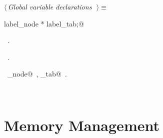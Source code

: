 \documentclass{report}
\begin{document}
\begin{flushleft} \small
\begin{minipage}{\linewidth} \label{scrap254}
$\langle\,${\it Global variable declarations}\nobreak\ {\footnotesize {}}$\,\rangle\equiv$
\vspace{-1ex}
\begin{list}{}{} \item
\mbox{}\verb@extern label_node * label_tab;@\\
\mbox{}\verb@@{\NWsep}
\end{list}
\vspace{-1ex}
\footnotesize\addtolength{\baselineskip}{-1ex}
\begin{list}{}{\setlength{\itemsep}{-\parsep}\setlength{\itemindent}{-\leftmargin}}
\item \NWtxtMacroDefBy\ .
\item \NWtxtMacroRefIn\ .
\end{list}
\vspace{-2ex}
\footnotesize\addtolength{\baselineskip}{-1ex}
\begin{list}{}{\setlength{\itemsep}{-\parsep}\setlength{\itemindent}{-\leftmargin}}
\item \NWtxtIdentsUsed\nobreak\  \verb@label_node@\nobreak\ , \verb@label_tab@\nobreak\ .\end{list}
\end{minipage}\\[4ex]
\end{flushleft}
\section{Memory Management} \label{memory-management}
\end{document}
